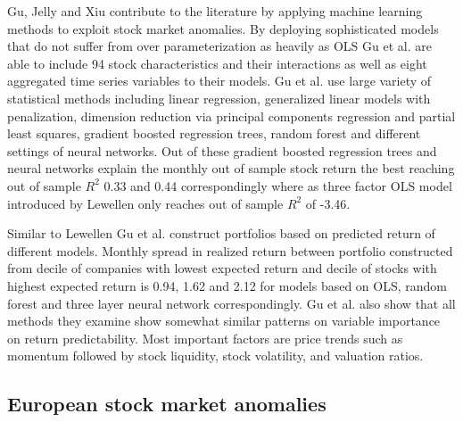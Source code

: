 \documentclass{article}
\begin{document}
Gu, Jelly and Xiu \citeyear{guetal} contribute to the literature by applying machine learning methods to exploit stock market anomalies. By deploying sophisticated models that do not suffer from over parameterization as heavily as OLS Gu et al. are able to include 94 stock characteristics and their interactions as well as eight aggregated time series variables to their models. Gu et al. use large variety of statistical methods including linear regression, generalized linear models with penalization, dimension reduction via principal components regression and partial least squares, gradient boosted regression trees, random forest and different settings of neural networks. Out of these gradient boosted regression trees and neural networks \footnotemark explain the monthly out of sample stock return the best reaching out of sample $R^{2}$ 0.33 and 0.44 correspondingly where as three factor OLS model introduced by Lewellen \citeyear{Lewellen2015} only reaches out of sample $R^{2}$ of -3.46. \par


Similar to Lewellen \citeyear{Lewellen2015} Gu et al. construct portfolios based on predicted return of different models. Monthly spread in realized return between portfolio constructed from decile of companies with lowest expected return and decile of stocks with highest expected return \footnotemark is 0.94, 1.62 and 2.12 for models based on OLS, random forest and three layer neural network correspondingly. Gu et al. also show that all methods they examine show somewhat similar patterns on variable importance on return predictability. Most important factors are price trends such as momentum followed by stock liquidity, stock volatility, and valuation ratios. \par


\subsection{European stock market anomalies}\label{EuropeanStockMarketAnomalies}
\end{document}
